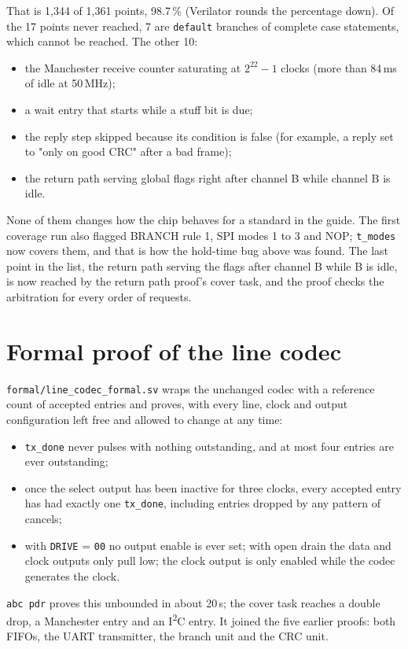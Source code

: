 \documentclass[11pt,a4paper]{article}
\newcommand{\sig}[1]{\texttt{#1}}
\begin{document}
That is 1,344 of 1,361 points, 98.7\,\% (Verilator rounds the percentage down). Of the 17 points never reached, 7 are \sig{default} branches of complete case statements, which cannot be reached. The other 10:
\begin{itemize}
\item the Manchester receive counter saturating at $2^{22}-1$ clocks (more than 84\,ms of idle at 50\,MHz);
\item a wait entry that starts while a stuff bit is due;
\item the reply step skipped because its condition is false (for example, a reply set to "only on good CRC" after a bad frame);
\item the return path serving global flags right after channel B while channel B is idle.
\end{itemize}
None of them changes how the chip behaves for a standard in the guide. The first coverage run also flagged BRANCH rule 1, SPI modes 1 to 3 and NOP; \sig{t\_modes} now covers them, and that is how the hold-time bug above was found. The last point in the list, the return path serving the flags after channel B while B is idle, is now reached by the return path proof's cover task, and the proof checks the arbitration for every order of requests.

\section{Formal proof of the line codec}

\sig{formal/line\_codec\_formal.sv} wraps the unchanged codec with a reference count of accepted entries and proves, with every line, clock and output configuration left free and allowed to change at any time:
\begin{itemize}
\item \sig{tx\_done} never pulses with nothing outstanding, and at most four entries are ever outstanding;
\item once the select output has been inactive for three clocks, every accepted entry has had exactly one \sig{tx\_done}, including entries dropped by any pattern of cancels;
\item with \sig{DRIVE} = \texttt{00} no output enable is ever set; with open drain the data and clock outputs only pull low; the clock output is only enabled while the codec generates the clock.
\end{itemize}
\sig{abc pdr} proves this unbounded in about 20\,s; the cover task reaches a double drop, a Manchester entry and an I\textsuperscript{2}C entry. It joined the five earlier proofs: both FIFOs, the UART transmitter, the branch unit and the CRC unit.
\end{document}
